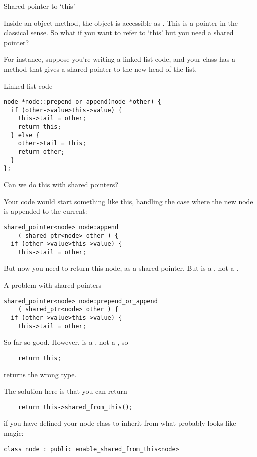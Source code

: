  {Shared pointer to `this'}

Inside an object method, the object is accessible as
. This is a pointer in the classical sense. So what
if you want to refer to `this' but you need a shared pointer?

For instance, suppose you're writing a linked list code, and your
 class has a method  that gives a shared
pointer to the new head of the list.

\begin{slide}{Linked list code}
  \label{sl:share-ptr-node}  
\begin{lstlisting}
node *node::prepend_or_append(node *other) {
  if (other->value>this->value) {
    this->tail = other;
    return this;
  } else {
    other->tail = this;
    return other;
  }
};
\end{lstlisting}
Can we do this with shared pointers?
\end{slide}

Your code would start something
like this, handling the case where the new node is appended to the current:
\begin{lstlisting}
shared_pointer<node> node:append
    ( shared_ptr<node> other ) {
  if (other->value>this->value) {
    this->tail = other;
\end{lstlisting}
But now you need to return this node, as a shared pointer. But
 is a , not a .

\begin{slide}{A problem with shared pointers}
  \label{sl:share-ptr-node-sh}
\begin{lstlisting}
shared_pointer<node> node:prepend_or_append
    ( shared_ptr<node> other ) {
  if (other->value>this->value) {
    this->tail = other;
\end{lstlisting}
So far so good. However,  is a , not a
, so
\begin{lstlisting}
    return this;
\end{lstlisting}
returns the wrong type.
\end{slide}

The solution here is that you can return
\begin{lstlisting}
    return this->shared_from_this();
\end{lstlisting}
if you have defined your node class to inherit from what probably
looks like magic:
\begin{lstlisting}
class node : public enable_shared_from_this<node>
\end{lstlisting}


